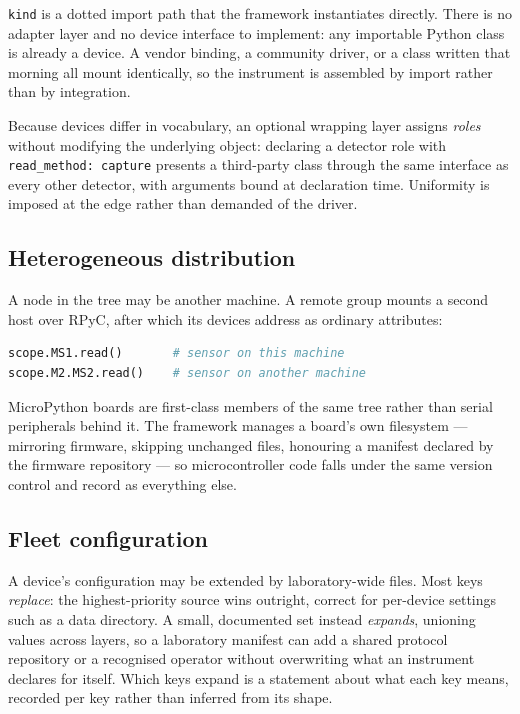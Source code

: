 \documentclass[10pt,a4paper,twocolumn]{article}
\begin{document}
\texttt{kind} is a dotted import path that the framework instantiates directly.
There is no adapter layer and no device interface to implement: any importable
Python class is already a device. A vendor binding, a community driver, or a class
written that morning all mount identically, so the instrument is assembled by import
rather than by integration.

Because devices differ in vocabulary, an optional wrapping layer assigns
\emph{roles} without modifying the underlying object: declaring a detector role with
\texttt{read\_method: capture} presents a third-party class through the same
interface as every other detector, with arguments bound at declaration time.
Uniformity is imposed at the edge rather than demanded of the driver.

\subsection{Heterogeneous distribution}
A node in the tree may be another machine. A remote group mounts a second host over
RPyC, after which its devices address as ordinary attributes:

\begin{lstlisting}[language=Python]
scope.MS1.read()       # sensor on this machine
scope.M2.MS2.read()    # sensor on another machine
\end{lstlisting}

MicroPython boards are first-class members of the same tree rather than serial
peripherals behind it. The framework manages a board's own filesystem --- mirroring
firmware, skipping unchanged files, honouring a manifest declared by the firmware
repository --- so microcontroller code falls under the same version control and record
as everything else.

\subsection{Fleet configuration}
A device's configuration may be extended by laboratory-wide files. Most keys
\emph{replace}: the highest-priority source wins outright, correct for per-device
settings such as a data directory. A small, documented set instead \emph{expands},
unioning values across layers, so a laboratory manifest can add a shared protocol
repository or a recognised operator without overwriting what an instrument declares for
itself. Which keys expand is a statement about what each key means, recorded per key
rather than inferred from its shape.
\end{document}

